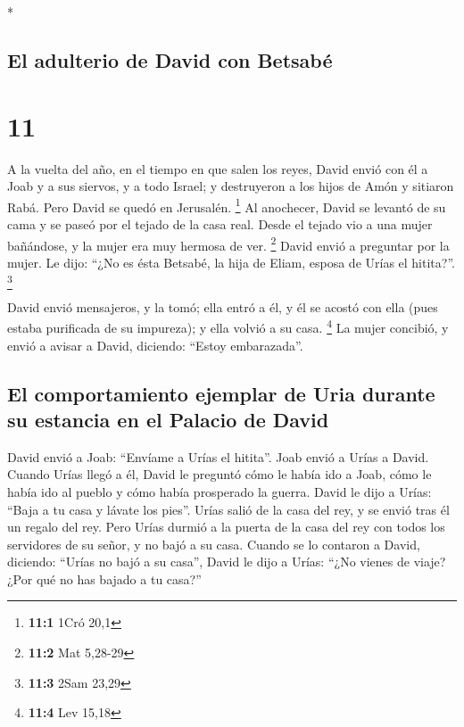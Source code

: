 \begin{paracol}{2}
\switchcolumn[0]*

\hypertarget{el-adulterio-de-david-con-betsabuxe9}{%
\subsection{El adulterio de David con
Betsabé}\label{el-adulterio-de-david-con-betsabuxe9}}

\hypertarget{section-20}{%
\section{11}\label{section-20}}

 A la vuelta del año, en el tiempo en que salen los reyes,
David envió con él a Joab y a sus siervos, y a todo Israel; y
destruyeron a los hijos de Amón y sitiaron Rabá. Pero David se quedó en
Jerusalén. \footnote{\textbf{11:1} 1Cró 20,1}  Al
anochecer, David se levantó de su cama y se paseó por el tejado de la
casa real. Desde el tejado vio a una mujer bañándose, y la mujer era muy
hermosa de ver. \footnote{\textbf{11:2} Mat 5,28-29} 
David envió a preguntar por la mujer. Le dijo: ``¿No es ésta Betsabé, la
hija de Eliam, esposa de Urías el hitita?''. \footnote{\textbf{11:3}
  2Sam 23,29}

 David envió mensajeros, y la tomó; ella entró a él, y él
se acostó con ella (pues estaba purificada de su impureza); y ella
volvió a su casa. \footnote{\textbf{11:4} Lev 15,18}  La
mujer concibió, y envió a avisar a David, diciendo: ``Estoy
embarazada''.

\hypertarget{el-comportamiento-ejemplar-de-uria-durante-su-estancia-en-el-palacio-de-david}{%
\subsection{El comportamiento ejemplar de Uria durante su estancia en el
Palacio de
David}\label{el-comportamiento-ejemplar-de-uria-durante-su-estancia-en-el-palacio-de-david}}

 David envió a Joab: ``Envíame a Urías el hitita''. Joab
envió a Urías a David.  Cuando Urías llegó a él, David le
preguntó cómo le había ido a Joab, cómo le había ido al pueblo y cómo
había prosperado la guerra.  David le dijo a Urías: ``Baja
a tu casa y lávate los pies''. Urías salió de la casa del rey, y se
envió tras él un regalo del rey.  Pero Urías durmió a la
puerta de la casa del rey con todos los servidores de su señor, y no
bajó a su casa.  Cuando se lo contaron a David, diciendo:
``Urías no bajó a su casa'', David le dijo a Urías: ``¿No vienes de
viaje? ¿Por qué no has bajado a tu casa?''


\end{paracol}
